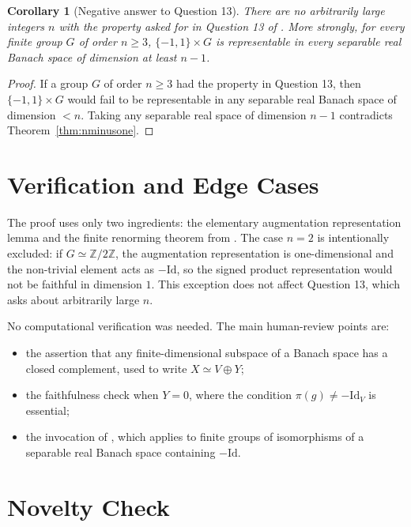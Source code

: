 \documentclass[11pt]{article}
\newtheorem{corollary}{Corollary}
\newcommand{\Id}{\mathrm{Id}}
\begin{document}
\begin{corollary}[Negative answer to Question 13]
There are no arbitrarily large integers $n$ with the property asked for in
Question 13 of \cite{FG}.  More strongly, for every finite group $G$ of order
$n\geq 3$, $\{-1,1\}\times G$ is representable in every separable real Banach
space of dimension at least $n-1$.
\end{corollary}

\begin{proof}
If a group $G$ of order $n\geq 3$ had the property in Question 13, then
$\{-1,1\}\times G$ would fail to be representable in any separable real
Banach space of dimension $<n$.  Taking any separable real space of dimension
$n-1$ contradicts Theorem~\ref{thm:nminusone}.
\end{proof}

\section*{Verification and Edge Cases}

The proof uses only two ingredients: the elementary augmentation
representation lemma and the finite renorming theorem from \cite{FG}.  The
case $n=2$ is intentionally excluded: if $G\simeq \mathbb{Z}/2\mathbb{Z}$,
the augmentation representation is one-dimensional and the non-trivial
element acts as $-\Id$, so the signed product representation would not be
faithful in dimension $1$.  This exception does not affect Question 13, which
asks about arbitrarily large $n$.

No computational verification was needed.  The main human-review points are:
\begin{itemize}
  \item the assertion that any finite-dimensional subspace of a Banach space
  has a closed complement, used to write $X\simeq V\oplus Y$;
  \item the faithfulness check when $Y=0$, where the condition
  $\pi(g)\neq -\Id_V$ is essential;
  \item the invocation of \cite[Theorem 8]{FG}, which applies to finite
  groups of isomorphisms of a separable real Banach space containing
  $-\Id$.
\end{itemize}

\section*{Novelty Check}
\end{document}
